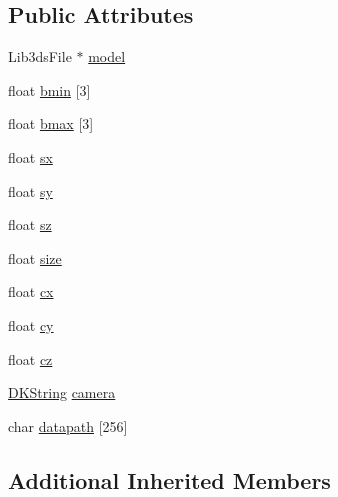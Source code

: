 \subsection*{Public Attributes}
\begin{DoxyCompactItemize}
\item 
Lib3ds\-File $\ast$ \hyperlink{class_d_k3ds_a29b89506bbbb2c3e7fe7819c60a421a3}{model}
\item 
float \hyperlink{class_d_k3ds_a545a26a1da5a9657ea733b3c68c5e47d}{bmin} \mbox{[}3\mbox{]}
\item 
float \hyperlink{class_d_k3ds_a48005a2684ba7baf584f7eba430405b0}{bmax} \mbox{[}3\mbox{]}
\item 
float \hyperlink{class_d_k3ds_a5cdfe11fe1f186a4658f53ea87212d91}{sx}
\item 
float \hyperlink{class_d_k3ds_ab47839ed130f6ca5cc997a1dd89ddf39}{sy}
\item 
float \hyperlink{class_d_k3ds_aea27dedf0d069c6bfce3ed166ab5370c}{sz}
\item 
float \hyperlink{class_d_k3ds_a5ec0d86a7237b2cc00298287cfd89403}{size}
\item 
float \hyperlink{class_d_k3ds_add34cbc487ae2726b6a4758c58178026}{cx}
\item 
float \hyperlink{class_d_k3ds_a786f24ce0f7bd9e98ebadd87e2ba3985}{cy}
\item 
float \hyperlink{class_d_k3ds_a155aa1b4cfeeb5a1c76ca516f737b138}{cz}
\item 
\hyperlink{_d_k_string_8h_ac168e8555ceba18e1a2919b21976bc84}{D\-K\-String} \hyperlink{class_d_k3ds_a990ac6faa0219928544e5327ea7f8e65}{camera}
\item 
char \hyperlink{class_d_k3ds_a11931ab3ae1f6ec845642b6ce7b1193b}{datapath} \mbox{[}256\mbox{]}
\end{DoxyCompactItemize}
\subsection*{Additional Inherited Members}


